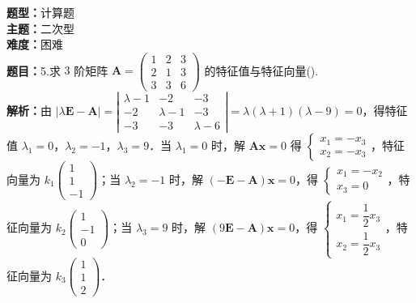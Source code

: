 \documentclass{ctexart}
\newenvironment{question}[5]{%
	\noindent\textbf{题型：}#1\\
	\textbf{主题：}#2\\
	\textbf{难度：}#3\\
	\textbf{题目：}#4\\
	\textbf{解析：}#5\\
	\vspace{1em}
}{}
\begin{document}
	\begin{question}
		{计算题}
		{二次型}
		{困难}
		{5.求 \(3\) 阶矩阵 \(\mathbf{A}=\left(\begin{array}{ccc}1 & 2 & 3 \\ 2 & 1 & 3 \\ 3 & 3 & 6\end{array}\right)\) 的特征值与特征向量(\qquad). }
		{由 \(|\lambda \mathbf{E} - \mathbf{A}| = \left|\begin{array}{ccc} \lambda - 1 & -2 & -3 \\ -2 & \lambda - 1 & -3 \\ -3 & -3 & \lambda - 6 \end{array}\right| = \lambda(\lambda + 1)(\lambda - 9) = 0\)，得特征值 \(\lambda_1 = 0\)，\(\lambda_2 = -1\)，\(\lambda_3 = 9\)．当 \(\lambda_1 = 0\) 时，解 \(\mathbf{A}\mathbf{x} = 0\) 得 \(\left\{\begin{array}{l}x_1 = -x_3 \\ x_2 = -x_3\end{array}\right.\)，特征向量为 \(k_1 \begin{pmatrix}1 \\ 1 \\ -1\end{pmatrix}\)；当 \(\lambda_2 = -1\) 时，解 \((-\mathbf{E} - \mathbf{A})\mathbf{x} = 0\)，得 \(\left\{\begin{array}{l}x_1 = -x_2 \\ x_3 = 0\end{array}\right.\)，特征向量为 \(k_2 \begin{pmatrix}1 \\ -1 \\ 0\end{pmatrix}\)；当 \(\lambda_3 = 9\) 时，解 \((9\mathbf{E} - \mathbf{A})\mathbf{x} = 0\)，得 \(\left\{\begin{array}{l}x_1 = \dfrac{1}{2}x_3 \\ x_2 = \dfrac{1}{2}x_3\end{array}\right.\)，特征向量为 \(k_3 \begin{pmatrix}1 \\ 1 \\ 2\end{pmatrix}\)．}
	\end{question}
\end{document}
